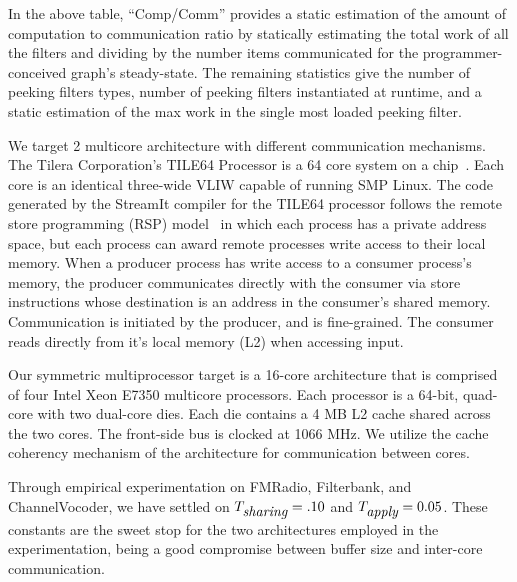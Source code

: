 In the above table, ``Comp/Comm'' provides a static estimation of the
amount of computation to communication ratio by statically estimating the total
work of all the filters and dividing by the number items communicated
for the programmer-conceived graph's steady-state.  The remaining
statistics give the number of peeking filters types, number of peeking
filters instantiated at runtime, and a static estimation of the max
work in the single most loaded peeking filter.

We target 2 multicore architecture with different communication
mechanisms.  The Tilera Corporation's TILE64 Processor is a 64 core
system on a chip~\cite{tilera}.  Each core is an identical three-wide
VLIW capable of running SMP Linux. The code generated by the StreamIt
compiler for the TILE64 processor follows the remote store programming
(RSP) model~\cite{rsp10} in which each process has a private address
space, but each process can award remote processes write access to
their local memory. When a producer process has write access to a
consumer process's memory, the producer communicates directly with the
consumer via store instructions whose destination is an address in the
consumer's shared memory.  Communication is initiated by the producer,
and is fine-grained.  The consumer reads directly from it's local
memory (L2) when accessing input.

Our symmetric multiprocessor target is a 16-core architecture that is
comprised of four Intel Xeon E7350 multicore processors.  Each processor
is a 64-bit, quad-core with two dual-core dies.  Each die contains a 4
MB L2 cache shared across the two cores.  The front-side bus is clocked
at 1066 MHz.  We utilize the cache coherency mechanism of the
architecture for communication between cores. 

Through empirical experimentation on FMRadio, Filterbank, and
ChannelVocoder, we have settled on $T_{\mbox{\it sharing}} =.10$ and
$T_{\mbox{\it apply}} = 0.05$. These constants are the sweet stop for the two
architectures employed in the experimentation, being a good compromise
between buffer size and inter-core communication.


